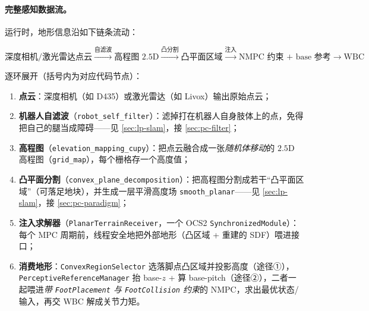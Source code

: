 \paragraph{完整感知数据流。}
运行时，地形信息沿如下链条流动：

\begin{equation*}
\boxed{\text{深度相机/激光雷达点云}} \xrightarrow{\text{自滤波}} \boxed{\text{高程图 }2.5\text{D}} \xrightarrow{\text{凸分割}} \boxed{\text{凸平面区域}} \xrightarrow{\text{注入}} \boxed{\text{NMPC 约束 + base 参考}} \xrightarrow{} \boxed{\text{WBC}}
\end{equation*}

逐环展开（括号内为对应代码节点）：
\begin{enumerate}
  \item \textbf{点云}：深度相机（如 D435）或激光雷达（如 Livox）输出原始点云；
  \item \textbf{机器人自滤波}（\texttt{robot\_self\_filter}）：滤掉打在机器人自身肢体上的点，免得把自己的腿当成障碍——见 \cref{sec:lp-slam}，接 \cref{sec:pc-filter}；
  \item \textbf{高程图}（\texttt{elevation\_mapping\_cupy}）：把点云融合成一张\emph{随机体移动}的 $2.5$D 高程图（\texttt{grid\_map}），每个栅格存一个高度值；
  \item \textbf{凸平面分割}（\texttt{convex\_plane\_decomposition}）：把高程图分割成若干“凸平面区域”（可落足地块），并生成一层平滑高度场 \texttt{smooth\_planar}——见 \cref{sec:lp-slam}，接 \cref{sec:pc-paradigm}；
  \item \textbf{注入求解器}（\texttt{PlanarTerrainReceiver}，一个 OCS2 \texttt{SynchronizedModule}）：每个 MPC 周期前，线程安全地把外部地形（凸区域 + 重建的 SDF）喂进接口；
  \item \textbf{消费地形}：\texttt{ConvexRegionSelector} 选落脚点凸区域并投影高度（途径①），\texttt{PerceptiveReferenceManager} 抬 base-$z$ + 算 base-pitch（途径②），二者一起喂进\emph{带 \texttt{FootPlacement} 与 \texttt{FootCollision} 约束}的 NMPC，求出最优状态/输入，再交 WBC 解成关节力矩。
\end{enumerate}

